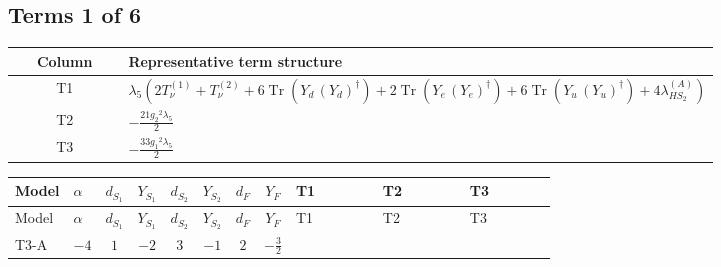 \documentclass[8pt]{article}
\begin{document}
\begin{landscape}
\subsection*{Terms 1 of 6}
\begin{center}
\begin{tabular}{@{}c >{\raggedright\arraybackslash}p{0.82\linewidth}@{}}
\toprule
Column & Representative term structure \\
\midrule
T1 & \(\displaystyle {\lambda_5} (2 T_{\nu}^{(1)}+T_{\nu}^{(2)}+6 \operatorname{Tr}\!\left({Y_d}\,\left({Y_d}\right)^{\dagger}\right)+2 \operatorname{Tr}\!\left({Y_e}\,\left({Y_e}\right)^{\dagger}\right)+6 \operatorname{Tr}\!\left({Y_u}\,\left({Y_u}\right)^{\dagger}\right)+4 {\lambda_{HS_2}^{(A)}})\) \\
\midrule
T2 & \(\displaystyle -\frac{21 {g_2}^2 {\lambda_5}}{2}\) \\
\midrule
T3 & \(\displaystyle -\frac{33 {g_1}^2 {\lambda_5}}{2}\) \\
\midrule
\bottomrule
\end{tabular}
\end{center}
\smallskip
\tiny
\begin{longtable}{@{}llcccccc >{\raggedright\arraybackslash}p{0.21\linewidth} >{\raggedright\arraybackslash}p{0.21\linewidth} >{\raggedright\arraybackslash}p{0.21\linewidth}@{}}
\toprule
Model & $\alpha$ & $d_{S_1}$ & $Y_{S_1}$ & $d_{S_2}$ & $Y_{S_2}$ & $d_F$ & $Y_F$ & T1 & T2 & T3 \\
\midrule
\endfirsthead
\toprule
Model & $\alpha$ & $d_{S_1}$ & $Y_{S_1}$ & $d_{S_2}$ & $Y_{S_2}$ & $d_F$ & $Y_F$ & T1 & T2 & T3 \\
\midrule
\endhead
T3-A & $-4$ & $1$ & $-2$ & $3$ & $-1$ & $2$ & $-\frac{3}{2}$ & \scriptsize\adjustbox{max width=\linewidth}{$\begin{gathered} {\lambda_5} (2 T_{\nu}^{(1)}+T_{\nu}^{(2)}+6 \operatorname{Tr}\!\left({Y_d}\,\left({Y_d}\right)^{\dagger}\right)+2 \operatorname{Tr}\!\left({Y_e}\,\left({Y_e}\right)^{\dagger}\right)+6 \operatorname{Tr}\!\left({Y_u}\,\left({Y_u}\right)^{\dagger}\right)+4 {\lambda_{HS_2}^{(A)}})\end{gathered}$} & \scriptsize\adjustbox{max width=\linewidth}{$\begin{gathered} -\frac{21 {g_2}^2 {\lambda_5}}{2}\end{gathered}$} & \scriptsize\adjustbox{max width=\linewidth}{$\begin{gathered} -\frac{33 {g_1}^2 {\lambda_5}}{2}\end{gathered}$} \\

\end{longtable}
\end{landscape}
\end{document}
